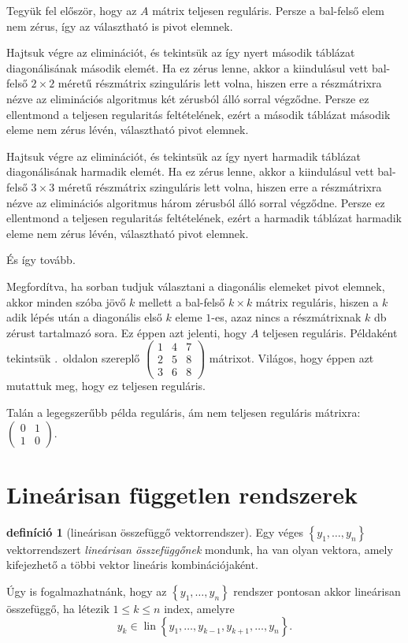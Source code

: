 \documentclass[a4paper, showtrims]{memoir}
\makeatletter
\renewenvironment{proof}[1][\proofname]
    {\par\pushQED{\qed}%
    \normalfont \topsep6\p@\@plus6\p@\relax
    \trivlist
    \item[\hskip\labelsep
        \itshape
    #1\@addpunct{:}]\ignorespaces}
    {\popQED\endtrivlist\@endpefalse}
\theoremstyle{plain}
\theoremstyle{remark}
\theoremstyle{definition}
\newtheorem{definition}[proposition]{definíció}
\DeclareMathOperator{\lin}{lin}
\makeatother
\begin{document}
\begin{proof}
    Tegyük fel először, hogy az $A$ mátrix teljesen reguláris.
    Persze a bal-felső elem nem zérus, így az választható is pivot elemnek.
    
    Hajtsuk végre az eliminációt, és tekintsük az így nyert második táblázat diagonálisának második elemét.
    Ha ez zérus lenne, akkor a kiindulásul vett bal-felső $2\times 2$ méretű részmátrix szinguláris lett volna,
    hiszen erre a részmátrixra nézve az eliminációs algoritmus két zérusból álló sorral végződne.
    Persze ez ellentmond a teljesen regularitás feltételének, ezért a második táblázat második eleme nem zérus
    lévén, választható pivot elemnek.

    Hajtsuk végre az eliminációt, és tekintsük az így nyert harmadik táblázat diagonálisának harmadik elemét.
    Ha ez zérus lenne, akkor a kiindulásul vett bal-felső $3\times 3$ méretű részmátrix szinguláris lett volna,
    hiszen erre a részmátrixra nézve az eliminációs algoritmus három zérusból álló sorral végződne.
    Persze ez ellentmond a teljesen regularitás feltételének, ezért a harmadik táblázat harmadik eleme nem zérus
    lévén, választható pivot elemnek.

    És így tovább.

    Megfordítva, ha sorban tudjuk választani a diagonális elemeket pivot elemnek,
    akkor minden szóba jövő $k$ mellett a bal-felső $k\times k$ mátrix reguláris,
    hiszen a $k$ adik lépés után a diagonális első $k$ eleme $1$-es, azaz nincs a részmátrixnak
    $k$ db zérust tartalmazó sora.
    Ez éppen azt jelenti, hogy $A$ teljesen reguláris.
\end{proof}
Példaként tekintsük \aazt{\pageref{ex:t-reg}}.~oldalon szereplő
\(
\begin{pmatrix}
      1 & 4 & 7 \\
      2         & 5 & 8 \\
      3         & 6 & 8
\end{pmatrix}
\)
mátrixot. Világos, hogy éppen azt mutattuk meg, hogy ez teljesen reguláris.

Talán a legegszerűbb példa reguláris, ám nem teljesen reguláris mátrixra:
\(
\begin{pmatrix}
    0&1\\1&0
\end{pmatrix}.
\)
\section{Lineárisan független rendszerek}
\begin{definition}[lineárisan összefüggő vektorrendszer]
	Egy véges $\left\{ y_1,\ldots,y_n \right\}$ vektorrendszert \emph{lineárisan összefüggőnek}
	mondunk, ha van olyan vektora, amely kifejezhető a többi vektor lineáris kombinációjaként.
\end{definition}
Úgy is fogalmazhatnánk, hogy az $\left\{ y_1,\ldots,y_n \right\}$ rendszer pontosan akkor
lineárisan összefüggő, ha létezik $1\leq k\leq n$ index, amelyre
\[
	y_k\in\lin\left\{ y_1,\ldots,y_{k-1},y_{k+1},\ldots,y_n \right\}.
\]
\end{document}
